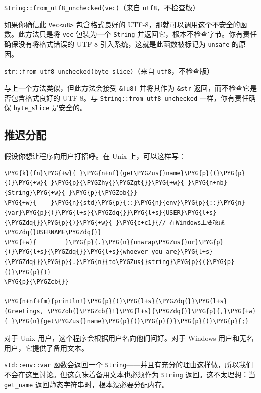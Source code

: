 \begin{myNote}
\texttt{String::from\_utf8\_unchecked(vec)}（来自 \texttt{utf8}，不检查版）
\end{myNote}

如果你确信此 \texttt{Vec<u8>} 包含格式良好的 UTF-8，那就可以调用这个不安全的函数。此方法只是将 \texttt{vec} 包装为一个 \texttt{String} 并返回它，根本不检查字节。你有责任确保没有将格式错误的 UTF-8 引入系统，这就是此函数被标记为 \texttt{unsafe} 的原因。

\begin{myNote}
\texttt{str::from\_utf8\_unchecked(byte\_slice)}（来自 \texttt{utf8}，不检查版）
\end{myNote}

与上一个方法类似，但此方法会接受 \texttt{\&[u8]} 并将其作为 \texttt{\&str} 返回，而不检查它是否包含格式良好的 UTF-8。与 \texttt{String::from\_utf8\_unchecked} 一样，你有责任确保 \texttt{byte\_slice} 是安全的。

\subsection{推迟分配}

假设你想让程序向用户打招呼。在 Unix 上，可以这样写：

\begin{Verbatim}[commandchars=\\\{\},breaklines=true,breakanywhere=true,fontsize=\codefont,xleftmargin=17bp]
\PYG{k}{fn}\PYG{+w}{ }\PYG{n+nf}{get\PYGZus{}name}\PYG{p}{(}\PYG{p}{)}\PYG{+w}{ }\PYG{p}{\PYGZhy{}\PYGZgt{}}\PYG{+w}{ }\PYG{n+nb}{String}\PYG{+w}{ }\PYG{p}{\PYGZob{}}
\PYG{+w}{    }\PYG{n}{std}\PYG{p}{::}\PYG{n}{env}\PYG{p}{::}\PYG{n}{var}\PYG{p}{(}\PYG{l+s}{\PYGZdq{}}\PYG{l+s}{USER}\PYG{l+s}{\PYGZdq{}}\PYG{p}{)}\PYG{+w}{ }\PYG{c+c1}{// 在Windows上要改成\PYGZdq{}USERNAME\PYGZdq{}}
\PYG{+w}{        }\PYG{p}{.}\PYG{n}{unwrap\PYGZus{}or}\PYG{p}{(}\PYG{l+s}{\PYGZdq{}}\PYG{l+s}{whoever you are}\PYG{l+s}{\PYGZdq{}}\PYG{p}{.}\PYG{n}{to\PYGZus{}string}\PYG{p}{(}\PYG{p}{)}\PYG{p}{)}
\PYG{p}{\PYGZcb{}}

\PYG{n+nf+fm}{println!}\PYG{p}{(}\PYG{l+s}{\PYGZdq{}}\PYG{l+s}{Greetings, \PYGZob{}\PYGZcb{}!}\PYG{l+s}{\PYGZdq{}}\PYG{p}{,}\PYG{+w}{ }\PYG{n}{get\PYGZus{}name}\PYG{p}{(}\PYG{p}{)}\PYG{p}{)}\PYG{p}{;}
\end{Verbatim}

对于 Unix 用户，这个程序会根据用户名向他们问好。对于 Windows 用户和无名用户，它提供了备用文本。

\texttt{std::env::var} 函数会返回一个 \texttt{String}——并且有充分的理由这样做，所以我们不会在这里讨论。但这意味着备用文本也必须作为 \texttt{String} 返回。这不太理想：当 \texttt{get\_name} 返回静态字符串时，根本没必要分配内存。

